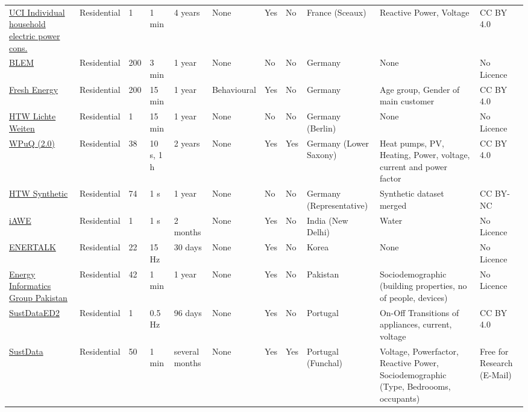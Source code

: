 \begin{tabular}{lllllllllll}
\href{\url{https://archive.ics.uci.edu/ml/datasets/Individual+household+electric+power+consumption}}{UCI Individual household electric power cons.} & Residential & 1 &1 min &  4 years &  None & Yes &  No &France (Sceaux) &Reactive Power, Voltage &   CC BY 4.0 \\
\href{\url{https://github.com/QuantLet/BLEM/tree/master/BLEMdataGlimpse}}{BLEM} & Residential &   200 &3 min &   1 year &  None &  No &  No &Germany &   None &  No Licence \\
\href{\url{https://zenodo.org/record/3855575\#.YKQgGKgzaUk}}{Fresh Energy} & Residential &   200 &   15 min &   1 year &   Behavioural & Yes &  No &Germany & Age group, Gender of main customer &   CC BY 4.0 \\
\href{\url{https://pvspeicher.htw-berlin.de/wp-content/uploads/MFH-Lastprofil_2014_17274_kWh.csv}}{HTW Lichte Weiten} & Residential & 1 &   15 min &   1 year &  None &  No &  No &   Germany (Berlin) &   None &  No Licence \\
\href{\url{https://zenodo.org/record/5642902#.Yg1VXe7MKYC}}{WPuQ (2.0)} & Residential &38 &10 s, 1 h &  2 years &  None & Yes & Yes & Germany (Lower Saxony) &  Heat pumps, PV, Heating, Power, voltage, current and power factor &   CC BY 4.0 \\
\href{\url{https://pvspeicher.htw-berlin.de/veroeffentlichungen/daten/lastprofile/}}{HTW Synthetic} & Residential &74 &  1 s &   1 year &  None &  No &  No &   Germany (Representative) &   Synthetic dataset merged &CC BY-NC \\
\href{\url{https://iawe.github.io/}}{iAWE} & Residential & 1 &  1 s & 2 months &  None & Yes &  No &  India (New Delhi) &  Water &  No Licence \\
\href{\url{https://github.com/ch-shin/ENERTALK-dataset}}{ENERTALK} & Residential &22 &15 Hz &  30 days &  None & Yes &  No &  Korea &   None &  No Licence \\
\href{\url{http://web.lums.edu.pk/~eig/CXyzsMgyXGpW1sBo}}{Energy Informatics Group Pakistan} & Residential &42 &1 min &   1 year &  None & Yes &  No &   Pakistan &  Sociodemographic (building properties, no of people, devices) &  No Licence \\
\href{\url{https://doi.org/10.17605/OSF.IO/JCN2Q}}{SustDataED2} & Residential & 1 &   0.5 Hz &  96 days &  None & Yes &  No &   Portugal & On-Off Transitions of appliances, current, voltage &   CC BY 4.0 \\
\href{\url{http://aveiro.m-iti.org/data/}}{SustData} & Residential &50 &1 min &   several months &  None & Yes & Yes & Portugal (Funchal) &Voltage, Powerfactor, Reactive Power, Sociodemographic (Type, Bedroooms, occupants) &  Free for Research (E-Mail) \\

\end{tabular}
